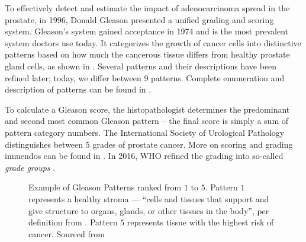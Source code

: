 To effectively detect and estimate the impact of adenocarcinoma spread in the prostate, in 1996, Donald Gleason presented a unified grading and scoring system.
Gleason's system gained acceptance in 1974 and is the most prevalent system doctors use today.
It categorizes the growth of cancer cells into distinctive patterns based on how much the cancerous tissue differs from healthy prostate gland cells, as shown in .
Several patterns and their descriptions have been refined later; today, we differ between 9 patterns. Complete enumeration and description of patterns can be found in \cite{gleason-patterns}.

To calculate a Gleason score, the histopathologist determines the predominant and second most common Gleason pattern -- the final score is simply a sum of pattern category numbers. The International Society of Urological Pathology distinguishes between $5$ grades of prostate cancer. More on scoring and grading innuendos can be found in \cite{gleason-pattern-grading}.
In 2016, WHO refined the grading into so-called \emph{grade groups} \cite{who-grade-groups}.

\begin{figure}
    \begin{center}
    \begin{minipage}{1\textwidth}
    \end{minipage}
    \caption{Example of Gleason Patterns ranked from $1$ to $5$. Pattern $1$ represents a healthy stroma --- ``cells and tissues that support and give structure to organs, glands, or other tissues in the body'', per definition from \cite{nci-stroma}. Pattern $5$ represents tissue with the highest risk of cancer. Sourced from \cite{gleason-pattern-description}}
    \label{fig:gp}
    \end{center}
\end{figure}

